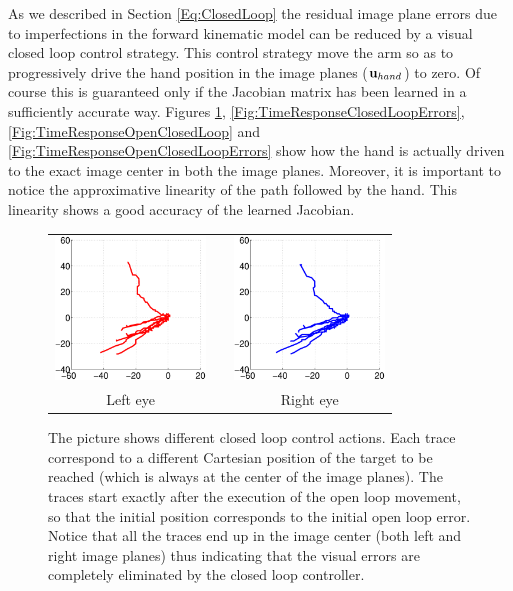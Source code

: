 As we described in Section \ref{Eq:ClosedLoop} the residual image plane errors 
due to imperfections in the forward kinematic model can be reduced by a visual closed loop
control strategy. This control strategy move the arm so as to progressively 
drive the hand position in the image planes ($\mathbf{u}_{hand}$) to zero. Of course this is guaranteed 
only if the  Jacobian matrix has been learned in a sufficiently accurate way. Figures 
\ref{Fig:ImagePlaneClosedLoopErrors}, \ref{Fig:TimeResponseClosedLoopErrors},  \ref{Fig:TimeResponseOpenClosedLoop} and \ref{Fig:TimeResponseOpenClosedLoopErrors} 
show how the hand is actually driven to the 
exact image center in both the image planes. Moreover, it is important to notice the
approximative linearity of the path followed by the hand. This linearity shows 
a good accuracy of the learned Jacobian.

\begin{figure}
  \begin{center}
	\begin{tabular}{ccc}
	  \parbox{40mm}{\includegraphics[width=40mm]{Figure/LeftEyeClosedLoop.eps}}  & \hspace{2cm} &
	  \parbox{40mm}{\includegraphics[width=40mm]{Figure/RightEyeClosedLoop.eps}}
	  \\
	  \parbox{40mm}{\centering Left eye } & \hspace{2cm} & \parbox{40mm}{\centering Right eye }
  \end{tabular}
\end{center}
\caption{The picture shows different closed loop control actions. Each trace correspond to a different Cartesian position of the target to be reached (which 
is always at the center of the image planes). The traces start exactly after the execution of the open loop movement, so that the initial position corresponds to the initial open loop error. Notice that all the traces end up in the image center (both left and right image planes) thus indicating that the visual errors are completely eliminated by the closed loop controller.}\label{Fig:ImagePlaneClosedLoopErrors}
  \end{figure}

